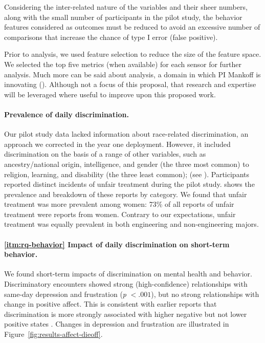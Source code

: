 Considering the inter-related nature of the variables and their sheer numbers, along with the small number of participants in the pilot study, the behavior features considered as outcomes must be reduced to avoid an excessive number of comparisons that increase the chance of type I error (false positive). 

Prior to analysis, we used feature selection to reduce the size of the feature space. We selected the top five metrics (when available) for each sensor for further analysis. Much more can be said about analysis, a domain in which PI Mankoff is innovating (\eg \cite{DBLP:conf/huc/EarlyFM16,DBLP:conf/chi/BanovicBCMD16,DBLP:conf/huc/KoehlerBOMD14}). Although not a focus of this proposal, that research and expertise will be leveraged where useful to improve upon this proposed work.

\paragraph{Prevalence of daily discrimination.}
Our pilot study data lacked information about race-related discrimination, an approach we corrected in the year one deployment. However, it included discrimination on the basis of a range of other variables, such as ancestry/national origin, intelligence, and gender (the three most common) to religion, learning, and disability (the three least common); (see ). Participants reported \numdiscriminationeventsfinal distinct incidents of unfair treatment during the pilot study.  shows the prevalence and breakdown of these reports by category. We found that unfair treatment was more prevalent among women: 73\% of all reports of unfair treatment were reports from women. Contrary to our expectations, unfair treatment was equally prevalent in both engineering and non-engineering majors. 


\paragraph{\ref{itm:rq-behavior} Impact of daily discrimination on short-term behavior.} We found short-term impacts of discrimination on mental health and behavior. Discriminatory encounters showed strong (high-confidence) relationships with same-day depression and frustration (\textit{p} $<.001$), but no strong relationships with change in positive affect. This is consistent with earlier reports that discrimination is more strongly associated with higher negative but not lower positive states \citep{Schmitt:2014}. Changes in depression and frustration are illustrated in Figure~\ref{fig:results-affect-dieoff}.  

